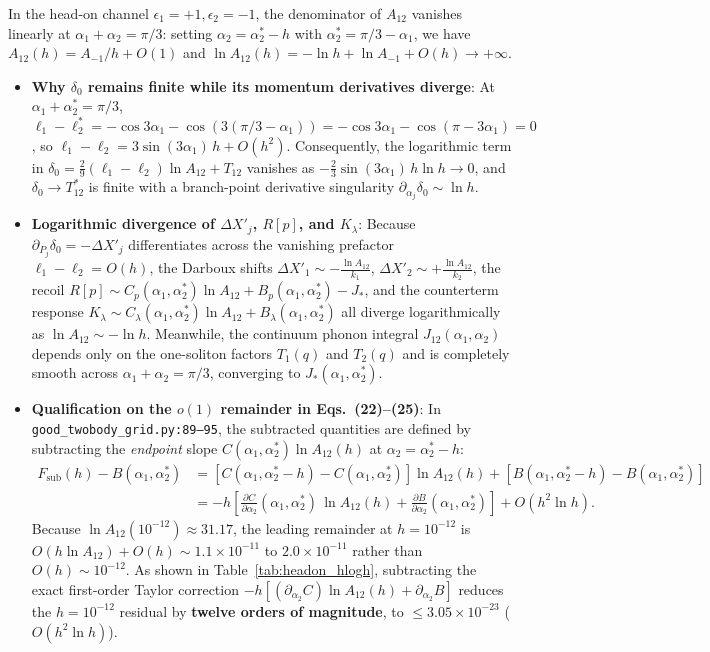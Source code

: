\documentclass[11pt,a4paper]{article}
\begin{document}
In the head-on channel $\epsilon_1 = +1, \epsilon_2 = -1$, the denominator of $A_{12}$ vanishes linearly at $\alpha_1 + \alpha_2 = \pi/3$: setting $\alpha_2 = \alpha_2^* - h$ with $\alpha_2^* = \pi/3 - \alpha_1$, we have $A_{12}(h) = A_{-1}/h + O(1)$ and $\ln A_{12}(h) = -\ln h + \ln A_{-1} + O(h) \to +\infty$.
\begin{itemize}
\item \textbf{Why $\delta_0$ remains finite while its momentum derivatives diverge}: At $\alpha_1 + \alpha_2^* = \pi/3$, $\ell_1 - \ell_2^* = -\cos 3\alpha_1 - \cos(3(\pi/3-\alpha_1)) = -\cos 3\alpha_1 - \cos(\pi - 3\alpha_1) = 0$, so $\ell_1 - \ell_2 = 3\sin(3\alpha_1)\,h + O(h^2)$. Consequently, the logarithmic term in $\delta_0 = \frac{2}{9}(\ell_1-\ell_2)\ln A_{12} + T_{12}$ vanishes as $-\frac{2}{3}\sin(3\alpha_1)\,h\ln h \to 0$, and $\delta_0 \to T_{12}^*$ is finite with a branch-point derivative singularity $\partial_{\alpha_j}\delta_0 \sim \ln h$.
\item \textbf{Logarithmic divergence of $\Delta X'_j$, $R[p]$, and $K_\lambda$}: Because $\partial_{P_j}\delta_0 = -\Delta X'_j$ differentiates across the vanishing prefactor $\ell_1 - \ell_2 = O(h)$, the Darboux shifts $\Delta X'_1 \sim -\frac{\ln A_{12}}{k_1}$, $\Delta X'_2 \sim +\frac{\ln A_{12}}{k_2}$, the recoil $R[p] \sim C_p(\alpha_1,\alpha_2^*)\ln A_{12} + B_p(\alpha_1,\alpha_2^*) - J_*$, and the counterterm response $K_\lambda \sim C_\lambda(\alpha_1,\alpha_2^*)\ln A_{12} + B_\lambda(\alpha_1,\alpha_2^*)$ all diverge logarithmically as $\ln A_{12} \sim -\ln h$. Meanwhile, the continuum phonon integral $J_{12}(\alpha_1,\alpha_2)$ depends only on the one-soliton factors $T_1(q)$ and $T_2(q)$ and is completely smooth across $\alpha_1+\alpha_2 = \pi/3$, converging to $J_*(\alpha_1,\alpha_2^*)$.
\item \textbf{Qualification on the $o(1)$ remainder in Eqs.~(22)--(25)}: In \texttt{good\_twobody\_grid.py:89--95}, the subtracted quantities are defined by subtracting the \emph{endpoint} slope $C(\alpha_1,\alpha_2^*)\ln A_{12}(h)$ at $\alpha_2 = \alpha_2^* - h$:
\begin{equation}
\begin{aligned}
F_{\mathrm{sub}}(h) - B(\alpha_1,\alpha_2^*) &= \left[C(\alpha_1,\alpha_2^*-h) - C(\alpha_1,\alpha_2^*)\right]\ln A_{12}(h) + \left[B(\alpha_1,\alpha_2^*-h) - B(\alpha_1,\alpha_2^*)\right] \\
&= -h\left[\frac{\partial C}{\partial\alpha_2}(\alpha_1,\alpha_2^*)\,\ln A_{12}(h) + \frac{\partial B}{\partial\alpha_2}(\alpha_1,\alpha_2^*)\right] + O(h^2\ln h).
\end{aligned}
\end{equation}
Because $\ln A_{12}(10^{-12}) \approx 31.17$, the leading remainder at $h=10^{-12}$ is $O(h\ln A_{12}) + O(h) \sim 1.1\times 10^{-11}$ to $2.0\times 10^{-11}$ rather than $O(h) \sim 10^{-12}$. As shown in Table~\ref{tab:headon_hlogh}, subtracting the exact first-order Taylor correction $-h[(\partial_{\alpha_2}C)\ln A_{12}(h) + \partial_{\alpha_2}B]$ reduces the $h=10^{-12}$ residual by \textbf{twelve orders of magnitude}, to $\le 3.05\times 10^{-23}$ ($O(h^2\ln h)$).
\end{itemize}
\end{document}
